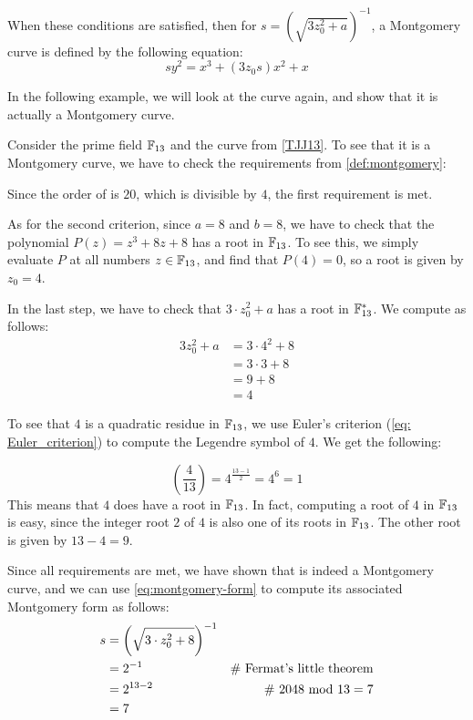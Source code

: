 When these conditions are satisfied, then for $s=({\sqrt{3z_0^{2}+a}})^{-1}$, a Montgomery curve is defined by the following equation:
\begin{equation}\label{eq:montgomery-form}
sy^{2}=x^{3}+(3z_0 s)x^{2}+x
\end{equation}

In the following example, we will look at the  curve again, and show that it is actually a Montgomery curve.
\begin{example}\label{TJJ13-montgomery}
Consider the prime field $\mathbb{F}_{13}$ and the  curve \TJJ{} from \examplename{} \ref{TJJ13}. To see that it is a Montgomery curve, we have to check the requirements from  \ref{def:montgomery}: 

Since the order  of \TJJ{} is $20$, which is divisible by $4$, the first requirement is met.

As for the second criterion, since $a=8$ and $b=8$, we have to check that the polynomial $P(z) = z^3 + 8z + 8$ has a root in $\mathbb{F}_{13}$. To see this, we simply evaluate $P$ at all numbers $z\in \mathbb{F}_{13}$, and find that $P(4)=0$, so a root is given by $z_0=4$. 

In the last step, we have to check that $3\cdot z_0^2 + a$ has a root in $\mathbb{F}_{13}^*$. We compute as follows:
\begin{align*}
3z_0^2 + a & = 3\cdot 4^2 + 8 \\
           & = 3 \cdot 3 + 8 \\
           & = 9 + 8 \\
           & = 4
\end{align*}

To see that $4$ is a quadratic residue in $\mathbb{F}_{13}$, we use Euler's criterion (\ref{eq: Euler_criterion}) to compute the Legendre symbol of $4$. We get the following:

$$
\left(\frac{4}{13}\right) = 4^{\frac{13-1}{2}} = 4^6 = 1
$$ 
This means that $4$ does have a root in $\mathbb{F}_{13}$. In fact, computing a root of $4$ in $\mathbb{F}_{13}$ is easy, since the integer root $2$ of $4$ is also one of its roots in $\mathbb{F}_{13}$. The other root is given by $13-4=9$.

Since all requirements are met, we have shown that \TJJ{} is indeed a Montgomery curve, and we can use \eqref{eq:montgomery-form} to compute its associated Montgomery form as follows:
\begin{align*}
s & = \left(\sqrt{3\cdot z_0^2 +8}\right)^{-1} \\
  & = 2^{-1} & \text{\# Fermat's little theorem} \\
  & = 2^{13-2} & \text{\# }2048 \text{ mod } 13 = 7\\
  & = 7
\end{align*}


\end{example}
